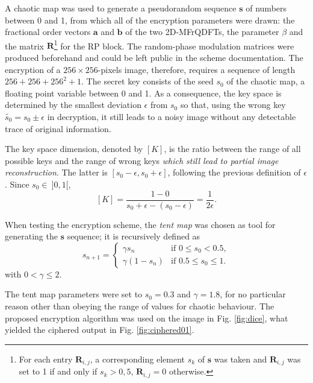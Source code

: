 A chaotic map was used to generate a pseudorandom sequence $ \mathbf{s} $ of numbers between 0 and 1, from which all of the encryption parameters were drawn: the fractional order vectors $ \mathbf{a} $ and $ \mathbf{b} $ of the two 2D-MFrQDFTs, the parameter $ \beta $ and the matrix $ \mathbf{R} $\footnote{For each entry $ \mathbf{R}_{i,j} $, a corresponding element $ s_k $ of $ \mathbf{s} $ was taken and $ \mathbf{R}_{i,j} $ was set to 1 if and only if $ s_k > 0{,}5 $, $ \mathbf{R}_{i,j} = 0 $ otherwise.} for the RP block. The random-phase modulation matrices were produced beforehand and could be left public in the scheme documentation. The encryption of a $ 256 \times 256 $-pixels image, therefore, requires a sequence of length $ 256 + 256 + 256^2 + 1  $. The secret key consists of the seed $ s_0 $ of the chaotic map, a floating point variable between 0 and 1.
As a consequence, the key space is determined by the smallest deviation $ \epsilon $ from $ s_0 $ so that, using the wrong key $ \widetilde{s_0} = s_0 \pm \epsilon $ in decryption, it still leads to a noisy image without any detectable trace of original information.

The key space dimension, denoted by $ [K] $, is the ratio between the range of all possible keys and the range of wrong keys \textit{which still lead to partial image reconstruction}. The latter is $ [s_0 - \epsilon, s_0 + \epsilon] $, following the previous definition of $ \epsilon $. Since $ s_0 \in \ ]0,1[ $,
\begin{equation}
[K] = \frac{1 - 0}{s_0 + \epsilon - (s_0 - \epsilon)} = \frac{1}{2 \epsilon}.
\end{equation}

When testing the encryption scheme, the \textit{tent map} \cite{singh2008optical} was chosen as tool for generating the $ \mathbf{s} $ sequence; it is recursively defined as
\begin{equation}
s_{n+1} =
\begin{cases}
\gamma s_n & \text{if } 0 \leq s_0 < 0{.}5, \\
\gamma(1 - s_n) & \text{if } 0{.}5 \leq s_0 \leq 1.
\end{cases}
\end{equation}
with $0 <  \gamma \leq 2 $.

The tent map parameters were set to $ s_0 = 0{.}3 $ and $ \gamma = 1{.}8 $, for no particular reason other than obeying the range of values for chaotic behaviour. The proposed encryption algorithm was used on the image in Fig. \ref{fig:dice}, what yielded the ciphered output in Fig. \ref{fig:ciphered01}.

